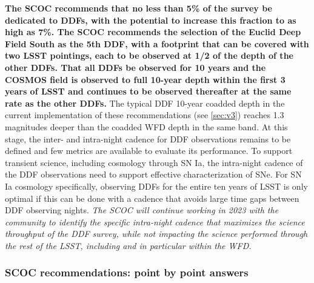  
{\bf The SCOC recommends that no less than 5\% of the survey be dedicated to DDFs, with the potential to increase this fraction to as high as 7\%. The SCOC recommends the selection of the Euclid Deep Field South as the 5th DDF, with a footprint that can be covered with two LSST pointings, each to be observed at 1/2 of the depth of the other DDFs. That all DDFs be observed for 10 years and the COSMOS field is observed to full 10-year depth within the first 3 years of LSST and continues to be observed thereafter at the same rate as the other DDFs.} The typical DDF 10-year coadded depth in the current implementation of these recommendations (see \autoref{sec:v3}) reaches 1.3 magnitudes deeper than the coadded WFD depth in the same band. At this stage, the inter- and intra-night cadence for DDF observations remains to be defined and few metrics are available to evaluate its performance. %
To support transient science, including cosmology through SN Ia, the intra-night cadence of the DDF observations need to support effective characterization of SNe. For SN Ia cosmology specifically, observing DDFs for the entire ten years of LSST is only optimal  if this can be done with a cadence that avoids large time gaps between DDF observing nights. \emph{The SCOC will continue working in 2023 with the community to identify the specific intra-night cadence that maximizes the science throughput of the DDF survey, while not impacting the science performed through the rest of the LSST, including and in particular within the WFD.}
 
 \subsubsection{SCOC recommendations: point by point answers}\label{sec:ddf_points}
 
